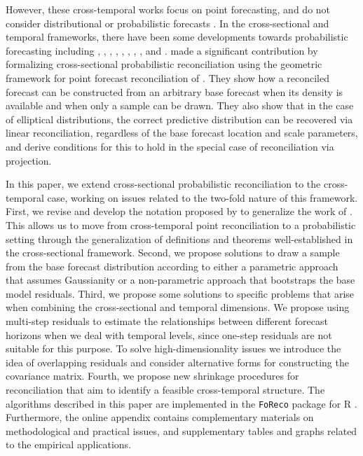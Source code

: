 \documentclass[a4paper,11pt]{article}
\theoremstyle{definition}
\begin{document}
However, these cross-temporal works focus on point forecasting, and do not consider distributional or probabilistic forecasts \citep{gneiting2014}. In the cross-sectional and temporal frameworks, there have been some developments towards probabilistic forecasting including  \cite{bentaieb2017}, \cite{panamtash2018}, \cite{jeon2019}, \cite{yang2020}, \cite{yagli2020},
\cite{bentaieb2021}, \cite{corani2021}, \cite{corani2022}, \cite{zambon2022} and \cite{wickramasuriya2021b}. \cite{panagiotelis2023} made a significant contribution by formalizing cross-sectional probabilistic reconciliation using the geometric framework for point forecast reconciliation of \cite{panagiotelis2021}. They show how a reconciled forecast can be constructed from an arbitrary base forecast when its density is available and when only a sample can be drawn. They also show that in the case of elliptical distributions, the correct predictive distribution can be recovered via linear reconciliation, regardless of the base forecast location and scale parameters, and derive conditions for this to hold in the special case of reconciliation via projection.

In this paper, we extend cross-sectional probabilistic reconciliation to the cross-temporal case, working on issues related to the two-fold nature of this framework. First, we revise and develop the notation proposed by \cite{difonzo2023} to generalize the work of \cite{panagiotelis2023}. This allows us to move from cross-temporal point reconciliation to a probabilistic setting through the generalization of definitions and theorems well-established in the cross-sectional framework. Second, we propose solutions to draw a sample from the base forecast distribution according to either a parametric approach that assumes Gaussianity or a non-parametric approach that bootstraps the base model residuals. Third, we propose some solutions to specific problems that arise when combining the cross-sectional and temporal dimensions. We propose using multi-step residuals to estimate the relationships between different forecast horizons when we deal with temporal levels, since one-step residuals are not suitable for this purpose. To solve high-dimensionality issues we introduce the idea of overlapping residuals and consider alternative forms for constructing the covariance matrix. Fourth, we propose new shrinkage procedures for reconciliation that aim to identify a feasible cross-temporal structure. The algorithms described in this paper are implemented in the \texttt{FoReco} package \citep{foreco2023} for R \citep{rcoreteam2022}. Furthermore, the online appendix contains complementary materials on methodological and practical issues, and supplementary tables and graphs related to the empirical applications.
\end{document}
